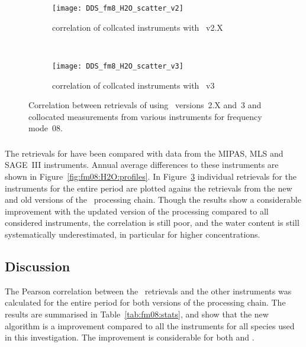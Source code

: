 \begin{figure}[htpb]
    \centering
    \begin{subfigure}[b]{0.49\textwidth}
        \texttt{[image: DDS\_fm8\_H2O\_scatter\_v2]}
        \caption{correlation of collcated instruments with \smr~v2.X}
        \label{fig:fm08:H2O:scatter:v2}
    \end{subfigure}
    \,
    \begin{subfigure}[b]{0.49\textwidth}
        \texttt{[image: DDS\_fm8\_H2O\_scatter\_v3]}
        \caption{correlation of collcated instruments with \smr~v3}
        \label{fig:fm08:H2O:scatter:v3}
    \end{subfigure}
    \caption{Correlation between retrievals of  using \smr\
    versions~2.X and~3 and collocated measurements from various instruments
    for frequency mode~08.}
    \label{fig:fm08:H2O:scatter}
\end{figure}

\subsubsection{}
\label{sec:fm08:comparison:H2O}
The retrievals for \chem{H_2O} have been compared with data from the MIPAS,
MLS and SAGE~III instruments. Annual average differences to these instruments
are shown in Figure~\ref{fig:fm08:H2O:profiles}. In
Figure~\ref{fig:fm08:H2O:scatter} individual retrievals for the instruments for
the entire period are plotted agains the retrievals from the new and old
versions of the \smr\ processing chain. Though the results show a considerable
improvement with the updated version of the processing compared to all
considered instruments, the correlation is still poor, and the water content is
still systematically underestimated, in particular for higher concentrations.


\subsubsection{}
\label{sec:fm08:comparison:temperature}


\subsection{Discussion}
\label{sec:fm08:discussion}
The Pearson correlation between the \smr\ retrievals and the other instruments
was calculated for the entire period for both versions of the processing chain.
The results are summarised in Table~\ref{tab:fm08:stats}, and show that the
new algorithm is a improvement compared to all the instruments for all species
used in this investigation. The improvement is considerable for both \chem{O_3}
and \chem{H_2O}.


